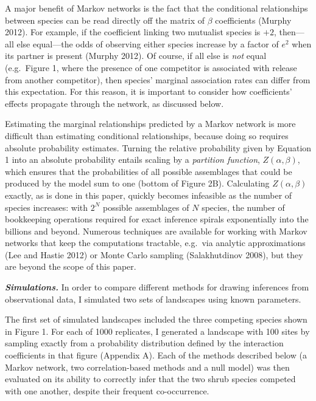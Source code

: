 \documentclass[12pt,]{article}
\begin{document}
\begin{spacing}{1.9}
\begin{flushleft}
A major benefit of Markov networks is the fact that the conditional
relationships between species can be read directly off the matrix of
\(\beta\) coefficients (Murphy 2012). For example, if the coefficient
linking two mutualist species is \(+2\), then---all else equal---the
odds of observing either species increase by a factor of \(e^2\) when
its partner is present (Murphy 2012). Of course, if all else is
\emph{not} equal (e.g.~Figure 1, where the presence of one competitor is
associated with release from another competitor), then species' marginal
association rates can differ from this expectation. For this reason, it
is important to consider how coefficients' effects propagate through the
network, as discussed below.

Estimating the marginal relationships predicted by a Markov network is
more difficult than estimating conditional relationships, because doing
so requires absolute probability estimates. Turning the relative
probability given by Equation 1 into an absolute probability entails
scaling by a \emph{partition function}, \(Z(\alpha, \beta)\), which
ensures that the probabilities of all possible assemblages that could be
produced by the model sum to one (bottom of Figure 2B). Calculating
\(Z(\alpha, \beta)\) exactly, as is done in this paper, quickly becomes
infeasible as the number of species increases: with \(2^N\) possible
assemblages of \(N\) species, the number of bookkeeping operations
required for exact inference spirals exponentially into the billions and
beyond. Numerous techniques are available for working with Markov
networks that keep the computations tractable, e.g.~via analytic
approximations (Lee and Hastie 2012) or Monte Carlo sampling
(Salakhutdinov 2008), but they are beyond the scope of this paper.

\textbf{\emph{Simulations.}} In order to compare different methods for
drawing inferences from observational data, I simulated two sets of
landscapes using known parameters.

The first set of simulated landscapes included the three competing
species shown in Figure 1. For each of 1000 replicates, I generated a
landscape with 100 sites by sampling exactly from a probability
distribution defined by the interaction coefficients in that figure
(Appendix A). Each of the methods described below (a Markov network, two
correlation-based methods and a null model) was then evaluated on its
ability to correctly infer that the two shrub species competed with one
another, despite their frequent co-occurrence.


\end{flushleft}
\end{spacing}
\end{document}
